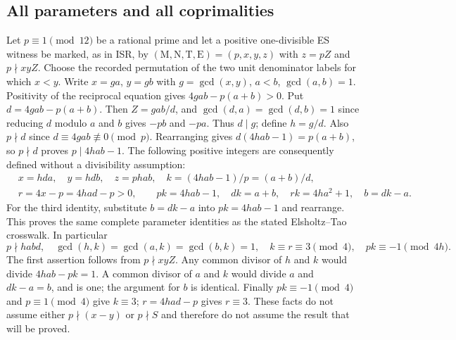 \subsection{All parameters and all coprimalities}
Let $p\equiv1\pmod{12}$ be a rational prime and let a positive
one-divisible ES witness be marked, as in ISR, by
$(\mathrm M,\mathrm N,\mathrm T,\mathrm E)=(p,x,y,z)$ with $z=pZ$
and $p\nmid xyZ$. Choose the recorded permutation of the two unit
denominator labels for which $x<y$. Write $x=g a$, $y=g b$ with
$g=\gcd(x,y)$, $a<b$, $\gcd(a,b)=1$. Positivity of the reciprocal
equation gives $4gab-p(a+b)>0$. Put $d=4gab-p(a+b)$. Then
$Z=gab/d$, and $\gcd(d,a)=\gcd(d,b)=1$ since reducing $d$ modulo
$a$ and $b$ gives $-pb$ and $-pa$. Thus $d\mid g$; define $h=g/d$.
Also $p\nmid d$ since $d\equiv4gab\not\equiv0\pmod p$.
Rearranging gives $d(4hab-1)=p(a+b)$, so $p\nmid d$ proves
$p\mid4hab-1$. The following positive integers are consequently
defined without a divisibility assumption:
\begin{equation}
 \begin{aligned}
 &x=hda,\quad y=hdb,\quad z=phab,\quad
 k=(4hab-1)/p=(a+b)/d,\\
 &r=4x-p=4had-p>0,\qquad
 pk=4hab-1,\quad dk=a+b,\quad rk=4ha^2+1,\quad b=dk-a.
 \end{aligned}                                          \tag{OE1}
\end{equation}
For the third identity, substitute $b=dk-a$ into $pk=4hab-1$
and rearrange. This proves the same complete parameter identities
as the stated Elsholtz--Tao crosswalk. In particular
\begin{equation}
 p\nmid habd,\quad \gcd(h,k)=\gcd(a,k)=\gcd(b,k)=1,
 \quad k\equiv r\equiv3\pmod4,
 \quad pk\equiv-1\pmod{4h}.                            \tag{OE2}
\end{equation}
The first assertion follows from $p\nmid xyZ$.
Any common divisor of $h$ and $k$ would divide $4hab-pk=1$.
A common divisor of $a$ and $k$ would divide $a$ and $dk-a=b$,
and is one; the argument for $b$ is identical. Finally
$pk\equiv-1\pmod4$ and $p\equiv1\pmod4$ give $k\equiv3$;
$r=4had-p$ gives $r\equiv3$. These facts do not assume either
$p\nmid(x-y)$ or $p\nmid S$ and therefore do not assume the result
that will be proved.

